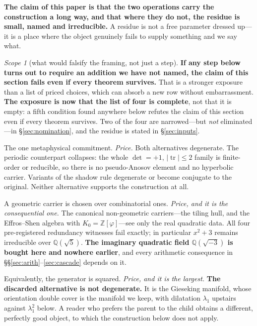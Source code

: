 \documentclass[11pt,reqno]{amsart}
\theoremstyle{plain}
\theoremstyle{definition}
\theoremstyle{remark}
\newtheorem{scope}[theorem]{Scope}
\newcommand{\Q}{\mathbb{Q}}
\newcommand{\Z}{\mathbb{Z}}
\newcommand{\tr}{\operatorname{tr}}
\begin{document}
\noindent\textbf{The claim of this paper is that the two operations carry the
construction a long way, and that where they do not, the residue is small, named and
irreducible.} A residue is not a free parameter dressed up---it is a place where the
object genuinely fails to supply something and we say what.

\begin{scope}[what would falsify the framing, not just a step]\label{sc:framing}
\textbf{If any step below turns out to require an addition we have not named, the claim
of this section fails even if every theorem survives.} That is a stronger exposure than
a list of priced choices, which can absorb a new row without embarrassment. \textbf{The
exposure is now that the list of four is complete}, not that it is empty: a fifth
condition found anywhere below refutes the claim of this section even if every theorem
survives. Two of the four are narrowed---but \emph{not} eliminated---in
\S\ref{sec:nomination}, and the residue is stated in \S\ref{sec:inputs}.
\end{scope}

\begin{description}[leftmargin=1.6em,style=nextline]
\item[\textnormal{\textbf{(C1) Description is inexhaustible.}}] The one metaphysical
  commitment. \emph{Price.} Both alternatives degenerate. The periodic counterpart
  collapses: the whole $\det=+1$, $|\tr|\le2$ family is finite-order or reducible, so
  there is no pseudo-Anosov element and no hyperbolic carrier. Variants of the shadow
  rule degenerate or become conjugate to the original. Neither alternative supports the
  construction at all.
\item[\textnormal{\textbf{(C2) The word is realized on the once-punctured torus.}}] A
  geometric carrier is chosen over combinatorial ones. \emph{Price, and it is the
  consequential one.} The canonical non-geometric carriers---the tiling hull, and the
  Effros--Shen algebra with $K_0=\Z[\varphi]$---see only the real quadratic data. All
  four pre-registered redundancy witnesses fail exactly; in particular $x^2+3$ remains
  irreducible over $\Q(\sqrt5)$. \textbf{The imaginary quadratic field $\Q(\sqrt{-3})$
  is bought here and nowhere earlier}, and every arithmetic consequence in
  \S\S\ref{sec:arith}--\ref{sec:cascade} depends on it.
\item[\textnormal{\textbf{(C3) The monodromy is orientation-preserving.}}] Equivalently,
  the generator is squared. \emph{Price, and it is the largest.} \textbf{The discarded
  alternative is not degenerate.} It is the Gieseking manifold, whose orientation double
  cover is the manifold we keep, with dilatation $\lambda_1$ upstairs against
  $\lambda_1^2$ below. A reader who prefers the parent to the child obtains a different,
  perfectly good object, to which the construction below does not apply.
\end{description}
\end{document}
